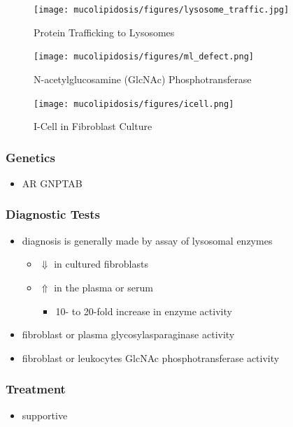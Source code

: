 \documentclass[12pt]{scrartcl}
\begin{document}
\begin{figure}[htbp]
\centering
\texttt{[image: mucolipidosis/figures/lysosome\_traffic.jpg]}
\caption[Protein trafficking to lysosomes]{\label{fig:org366812c}Protein Trafficking to Lysosomes}
\end{figure}


\begin{figure}[htbp]
\centering
\texttt{[image: mucolipidosis/figures/ml\_defect.png]}
\caption[N-acetylglucosamine (GlcNAc) phosphotransferase]{\label{fig:org7b78b6d}N-acetylglucosamine (GlcNAc) Phosphotransferase}
\end{figure}

\begin{figure}[htbp]
\centering
\texttt{[image: mucolipidosis/figures/icell.png]}
\caption{\label{fig:org2e03339}I-Cell in Fibroblast Culture}
\end{figure}

\subsubsection{Genetics}
\label{sec:org3654f6a}
\begin{itemize}
\item AR GNPTAB
\end{itemize}

\subsubsection{Diagnostic Tests}
\label{sec:orge1e723a}
\begin{itemize}
\item diagnosis is generally made by assay of lysosomal enzymes
\begin{itemize}
\item \(\Downarrow\) in cultured fibroblasts
\item \(\Uparrow\) in the plasma or serum
\begin{itemize}
\item 10- to 20-fold increase in enzyme activity
\end{itemize}
\end{itemize}
\item fibroblast or plasma glycosylasparaginase activity
\item fibroblast or leukocytes GlcNAc phosphotransferase activity
\end{itemize}

\subsubsection{Treatment}
\label{sec:org6785312}
\begin{itemize}
\item supportive
\end{itemize}
\end{document}
